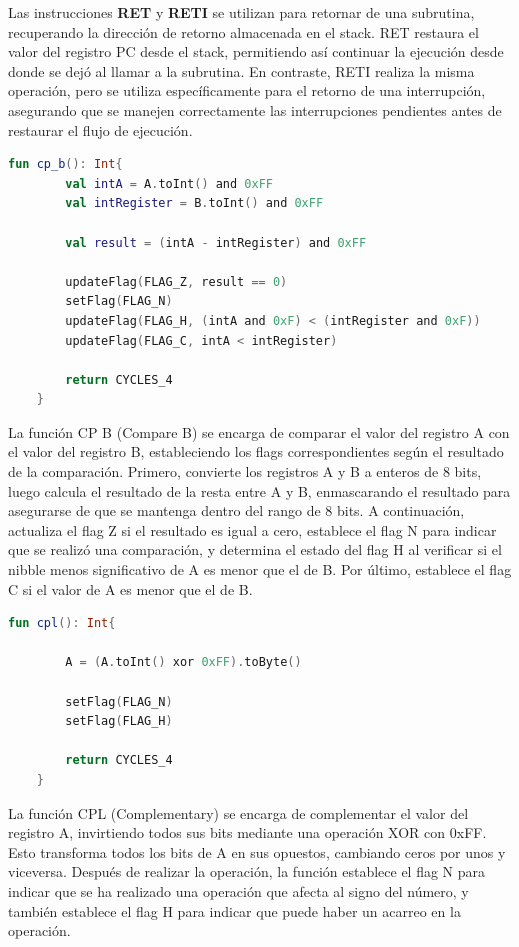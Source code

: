 Las instrucciones \textbf{RET} y \textbf{RETI} se utilizan para retornar de una subrutina, recuperando la dirección de retorno almacenada en el stack. RET restaura el valor del registro PC desde el stack, permitiendo así continuar la ejecución desde donde se dejó al llamar a la subrutina. En contraste, RETI realiza la misma operación, pero se utiliza específicamente para el retorno de una interrupción, asegurando que se manejen correctamente las interrupciones pendientes antes de restaurar el flujo de ejecución.

\begin{lstlisting}[language=Kotlin, caption={Operación CP}, label={code:kotlincp}]
    fun cp_b(): Int{
        val intA = A.toInt() and 0xFF
        val intRegister = B.toInt() and 0xFF

        val result = (intA - intRegister) and 0xFF

        updateFlag(FLAG_Z, result == 0)
        setFlag(FLAG_N)
        updateFlag(FLAG_H, (intA and 0xF) < (intRegister and 0xF))
        updateFlag(FLAG_C, intA < intRegister)
        
        return CYCLES_4
    }
\end{lstlisting}

La función CP B (Compare B) se encarga de comparar el valor del registro A con el valor del registro B, estableciendo los flags correspondientes según el resultado de la comparación. Primero, convierte los registros A y B a enteros de 8 bits, luego calcula el resultado de la resta entre A y B, enmascarando el resultado para asegurarse de que se mantenga dentro del rango de 8 bits. A continuación, actualiza el flag Z si el resultado es igual a cero, establece el flag N para indicar que se realizó una comparación, y determina el estado del flag H al verificar si el nibble menos significativo de A es menor que el de B. Por último, establece el flag C si el valor de A es menor que el de B.

\begin{lstlisting}[language=Kotlin, caption={Operación CPL}, label={code:kotlincpl}]
    fun cpl(): Int{

        A = (A.toInt() xor 0xFF).toByte()

        setFlag(FLAG_N)
        setFlag(FLAG_H)

        return CYCLES_4
    }
\end{lstlisting}

La función CPL (Complementary) se encarga de complementar el valor del registro A, invirtiendo todos sus bits mediante una operación XOR con 0xFF. Esto transforma todos los bits de A en sus opuestos, cambiando ceros por unos y viceversa. Después de realizar la operación, la función establece el flag N para indicar que se ha realizado una operación que afecta al signo del número, y también establece el flag H para indicar que puede haber un acarreo en la operación.

